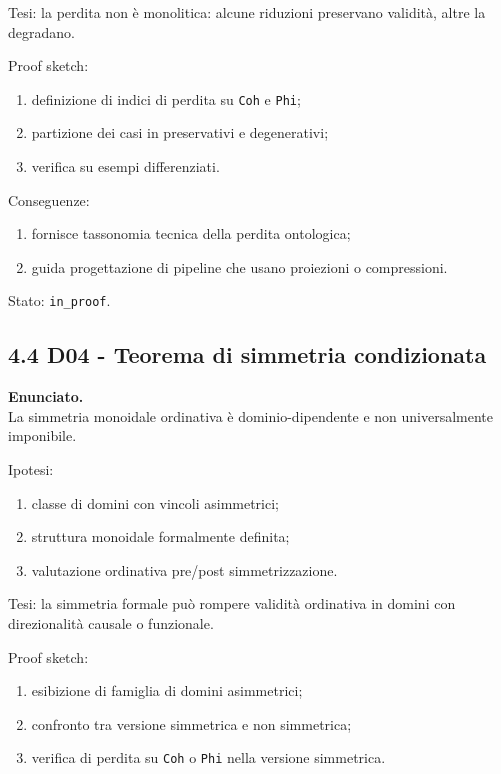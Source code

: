 Tesi:
la perdita non è monolitica: alcune riduzioni preservano validità, altre la degradano.

Proof sketch:

\begin{enumerate}
\def\labelenumi{\arabic{enumi}.}
\tightlist
\item
  definizione di indici di perdita su \texttt{Coh} e \texttt{Phi};
\item
  partizione dei casi in preservativi e degenerativi;
\item
  verifica su esempi differenziati.
\end{enumerate}

Conseguenze:

\begin{enumerate}
\def\labelenumi{\arabic{enumi}.}
\tightlist
\item
  fornisce tassonomia tecnica della perdita ontologica;
\item
  guida progettazione di pipeline che usano proiezioni o compressioni.
\end{enumerate}

Stato: \texttt{in\_proof}.

\subsection{4.4 D04 - Teorema di simmetria condizionata}

\textbf{Enunciato.}\\
La simmetria monoidale ordinativa è dominio-dipendente e non universalmente imponibile.

Ipotesi:

\begin{enumerate}
\def\labelenumi{\arabic{enumi}.}
\tightlist
\item
  classe di domini con vincoli asimmetrici;
\item
  struttura monoidale formalmente definita;
\item
  valutazione ordinativa pre/post simmetrizzazione.
\end{enumerate}

Tesi:
la simmetria formale può rompere validità ordinativa in domini con direzionalità causale o funzionale.

Proof sketch:

\begin{enumerate}
\def\labelenumi{\arabic{enumi}.}
\tightlist
\item
  esibizione di famiglia di domini asimmetrici;
\item
  confronto tra versione simmetrica e non simmetrica;
\item
  verifica di perdita su \texttt{Coh} o \texttt{Phi} nella versione simmetrica.
\end{enumerate}


